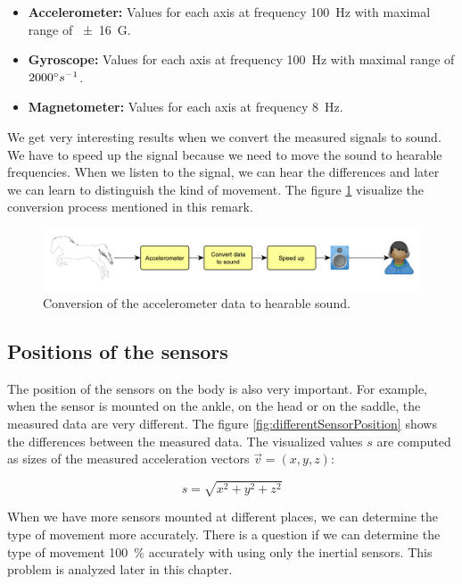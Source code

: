 \begin{itemize}
	\item \textbf{Accelerometer:} Values for each axis at frequency \SI{100}{Hz} with maximal range of \SI{\pm 16}{G}.
	\item \textbf{Gyroscope:} Values for each axis at frequency \SI{100}{Hz} with maximal range of $2000 \degree s^{-1}$.
	\item \textbf{Magnetometer:} Values for each axis at frequency \SI{8}{Hz}.
\end{itemize}

\begin{remark}
	We get very interesting results when we convert the measured signals to sound. We have to speed up the signal because we need to move the sound to hearable frequencies. When we listen to the signal, we can hear the differences and later we can learn to distinguish the kind of movement. The figure \ref{accToSound} visualize the conversion process mentioned in this remark.
	
	\begin{figure}
		\centering
		\label{accToSound}
		\caption{Conversion of the accelerometer data to hearable sound.}
		\includegraphics[width=\linewidth]{img/accToSound.pdf}
	\end{figure}
\end{remark}

\subsection{Positions of the sensors}
The position of the sensors on the body is also very important. For example, when the sensor is mounted on the ankle, on the head or on the saddle, the measured data are very different. The figure \ref{fig:differentSensorPosition} shows the differences between the measured data. The visualized values $s$ are computed as sizes of the measured acceleration vectors $\vec{v} = (x,y,z)$:

$$ s = \sqrt{x^{2}+y^{2}+z^{2}} $$

When we have more sensors mounted at different places, we can determine the type of movement more accurately. There is a question if we can determine the type of movement \SI{100}{\%} accurately with using only the inertial sensors. This problem is analyzed later in this chapter.

